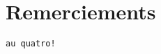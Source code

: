 \chapter*{Remerciements}
\label{sec:acknowledgement}
\begin{flushright}
\Huge{\texttt{au quatro!}}
\end{flushright}
